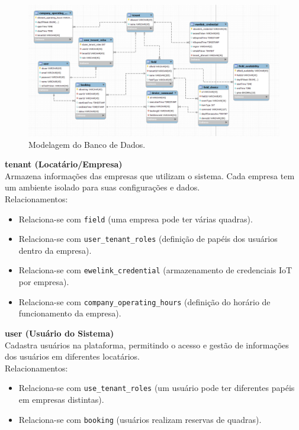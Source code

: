 \begin{figure}[htp]
	\caption{\label{fig:modelagem_banco_dados}Modelagem do Banco de Dados.}
	\begin{center}
	  \includegraphics[scale=0.38]{images/cap5/modelage_banco_dados.png}
	\end{center}
\end{figure}

\textbf{tenant (Locatário/Empresa)}\\
Armazena informações das empresas que utilizam o sistema. Cada empresa tem um ambiente isolado para suas configurações e dados.\\
Relacionamentos:
\begin{itemize}
	\item Relaciona-se com \texttt{field} (uma empresa pode ter várias quadras).
	\item Relaciona-se com \texttt{user\_tenant\_roles} (definição de papéis dos usuários dentro da empresa).
	\item Relaciona-se com \texttt{ewelink\_credential} (armazenamento de credenciais IoT por empresa).
	\item Relaciona-se com \texttt{company\_operating\_hours} (definição do horário de funcionamento da empresa).
\end{itemize}

\textbf{user (Usuário do Sistema)}\\
Cadastra usuários na plataforma, permitindo o acesso e gestão de informações dos usuários em diferentes locatários. \\
Relacionamentos: 
\begin{itemize} 
	\item Relaciona-se com \texttt{use\_tenant\_roles} (um usuário pode ter diferentes papéis em empresas distintas). 
	\item Relaciona-se com \texttt{booking} (usuários realizam reservas de quadras). 
\end{itemize}

